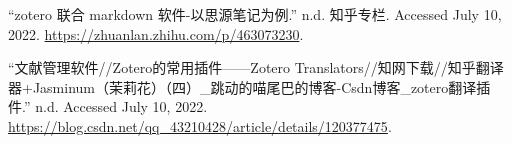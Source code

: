 \hypertarget{refs}{}
\begin{CSLReferences}{1}{0}
\leavevmode{}%
{``zotero 联合 markdown 软件-以思源笔记为例.''} n.d. {知乎专栏}.
Accessed July 10, 2022. \url{https://zhuanlan.zhihu.com/p/463073230}.

\leavevmode{}%
{``文献管理软件//{Zotero的常用插件}------{Zotero}
Translators//知网下载//知乎翻译器+{Jasminum}（茉莉花）（四）\_跳动的喵尾巴的博客-{Csdn博客}\_zotero翻译插件.''}
n.d. Accessed July 10, 2022.
\url{https://blog.csdn.net/qq_43210428/article/details/120377475}.

\end{CSLReferences}
